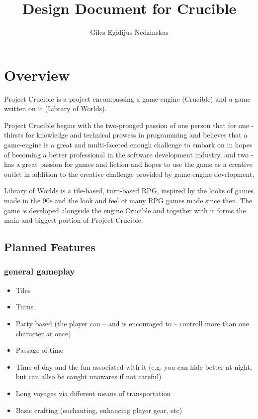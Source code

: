 \documentclass[a4paper,10pt]{book}
\begin{document}
\newcommand{\Projectname}{Project Crucible}
\newcommand{\Enginename}{Crucible}
\newcommand{\Gamename}{Library of Worlds}

\author{Giles Egidijus Nedzinskas}
\title{Design Document for Crucible}
\maketitle{}

\tableofcontents


\chapter{Overview}
\Projectname{} is a project encompassing a game-engine (\Enginename{}) and a game written on it (\Gamename{}).

\Projectname{} begins with the two-pronged passion of one person that for one - thirsts for knowledge and technical prowess in programming and believes that a game-engine is a great and multi-faceted enough challenge to embark on in hopes of becoming a better professional in the software development industry, and two - has a great passion for games and fiction and hopes to use the game as a creative outlet in addition to the creative challenge provided by game engine development.

\Gamename{} is a tile-based, turn-based RPG, inspired by the looks of games made in the 90s and the look and feel of many RPG games made since then. The game is developed alongside the engine \Enginename{} and together with it forms the main and biggest portion of \Projectname{}.

\section{Planned Features}
\subsection{general gameplay}
\begin{itemize}
  \item Tiles
  \item Turns
  \item Party based (the player can -- and is encouraged to -- controll more than one character at once)
  \item Passage of time
  \item Time of day and the fun associated with it (e.g. you can hide better at night, but can allso be caught
    unawares if not careful)
  \item Long voyages via different means of transportation
  \item Basic crafting (enchanting, enhancing player gear, etc)
\end{itemize}
\end{document}

